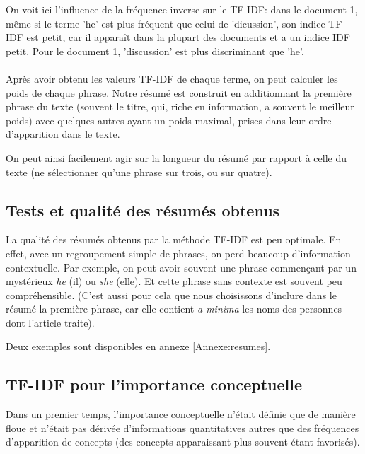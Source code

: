 \documentclass[a4paper, 12pt]{article}
\begin{document}
On voit ici l'influence de la fréquence inverse sur le TF-IDF: dans le document 1, même si le terme 'he' est plus fréquent que celui de 'dicussion', son indice TF-IDF est petit, car il apparaît dans la plupart des documents et a un indice IDF petit. Pour le document 1, 'discussion' est plus discriminant que 'he'.

\paragraph{}
Après avoir obtenu les valeurs TF-IDF de chaque terme, on peut calculer les poids de chaque phrase. Notre résumé est construit en additionnant la première phrase du texte (souvent le titre, qui, riche en information, a souvent le meilleur poids) avec quelques autres ayant un poids maximal, prises dans leur ordre d'apparition dans le texte.

On peut ainsi facilement agir sur la longueur du résumé par rapport à celle du texte (ne sélectionner qu'une phrase sur trois, ou sur quatre).

\subsection{Tests et qualité des résumés obtenus}

La qualité des résumés obtenus par la méthode TF-IDF est peu optimale. En effet, avec un regroupement simple de phrases, on perd beaucoup d'information contextuelle. Par exemple, on peut avoir souvent une phrase commençant par un mystérieux \textit{he} (il) ou \textit{she} (elle). Et cette phrase sans contexte est souvent peu compréhensible. (C'est aussi pour cela que nous choisissons d'inclure dans le résumé la première phrase, car elle contient \textit{a minima} les noms des personnes dont l'article traite).

Deux exemples sont disponibles en annexe \ref{Annexe:resumes}.


\subsection{TF-IDF pour l'importance conceptuelle}

Dans un premier temps, l'importance conceptuelle n'était définie que de manière floue et n'était pas dérivée d'informations quantitatives autres que des fréquences d'apparition de concepts (des concepts apparaissant plus souvent étant favorisés).
\end{document}
